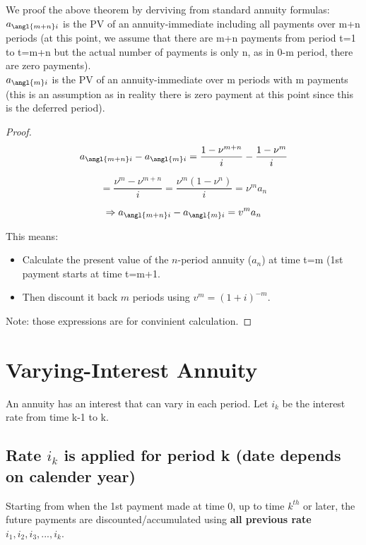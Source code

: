 \begin{comments}
    We proof the above theorem by derviving from standard annuity formulas: \\

    $a_{\angl{m+n}i}$ is the PV of an annuity-immediate including all payments over m+n periods (at this point, we assume that there are m+n payments from period t=1 to t=m+n but the actual number of payments is only n, as in 0-m period, there are zero payments).\\
    
    $a_{\angl{m}i}$ is the PV of an annuity-immediate over m periods with m payments (this is an assumption as in reality there is zero payment at this point since this is the deferred period). 
\end{comments}

\begin{proof}
    \[
a_{\angl{m+n}i} - a_{\angl{m}i} = \frac{1 - \nu^{m+n}}{i} - \frac{1 - \nu^m}{i}
\]

\[
= \frac{\nu^m - \nu^{m+n}}{i}
= \frac{\nu^m (1 - \nu^n)}{i}
= \nu^m a_n
\]

\[
\Rightarrow a_{\angl{m+n}i} - a_{\angl{m}i} = v^m a_n
\]

This means:
\begin{itemize}
    \item Calculate the present value of the \( n \)-period annuity (\( a_n \)) at time t=m (1st payment starts at time t=m+1. 
    \item Then discount it back \( m \) periods using \( v^m = (1 + i)^{-m} \).
\end{itemize}

Note: those expressions are for convinient calculation.

\end{proof}
\section{Varying-Interest Annuity}
\begin{definition}
    An annuity has an interest that can vary in each period. Let $i_k$ be the interest rate from time k-1 to k. 
\end{definition}

\subsection{Rate $i_k$ is applied for period k (date depends on calender year)}
\begin{comments}
    Starting from when the 1st payment made at time 0, up to time $k^{th}$ or later, the future payments are discounted/accumulated using \textbf{all previous rate} $i_1, i_2, i_3,...,i_k$. \\
\end{comments}


